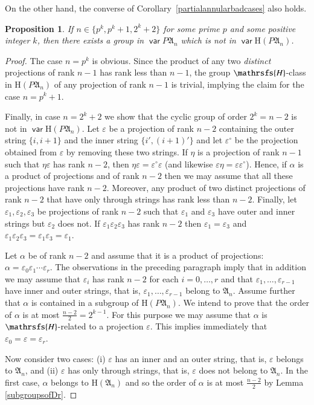 \documentclass[preprint,1p,times]{elsarticle}
\DeclareMathOperator{\var}{\mathsf{var}}
\numberwithin{equation}{section}
\newtheorem{Prop}[Thm]{Proposition}
\theoremstyle{remark}
\def\Hc{\mathrsfs{H}}
\def\al{\alpha}
\def\ep{\varepsilon}
\def\H{\mathrm H}
\def\A{\mathfrak{A}}
\begin{document}
On the other hand, the converse of Corollary~\ref{partialannularbadcases} also holds.

\begin{Prop}
\label{partialannulargoodcases} If $n\in\{p^k,p^k+1,2^k+2\}$ for some prime $p$ and some positive integer $k$, then
there exists a group in $\var P\A_n$ which is not in $\var\H(P\A_n)$.
\end{Prop}

\begin{proof} The case $n=p^k$ is obvious. Since the product of any two
\emph{distinct} projections of rank $n-1$ has rank less than $n-1$, the group $\Hc$-class in $\H(P\A_n)$ of any
projection of rank $n-1$ is trivial, implying the claim for the case $n=p^k+1$.

Finally, in case $n=2^k+2$ we show that the cyclic group of order $2^k=n-2$ is not in $\var\H(P\A_n)$. Let $\ep$ be a
projection of rank $n-2$ containing the outer string $\{i,i+1\}$ and the inner string $\{i',(i+1)'\}$ and let
$\ep^\circ$ be the projection obtained from $\ep$ by removing these two strings. If $\eta$ is a projection of rank
$n-1$ such that $\eta\ep$ has rank $n-2$, then $\eta\ep=\ep^\circ\ep$ (and likewise $\ep\eta=\ep\ep^\circ$). Hence, if
$\al$ is {a product of projections and of rank $n-2$} then we may assume that all these projections have rank  $n-2$.
Moreover, any product of two distinct projections of rank $n-2$ that have only through strings has rank less than
$n-2$. Finally, let $\ep_1, \ep_2, \ep_3$ be projections of rank $n-2$ such that $\ep_1$ and $\ep_3$ have outer and
inner strings but $\ep_2$ does not. If $\ep_1\ep_2\ep_3$ has rank $n-2$ then $\ep_1=\ep_3$ and
$\ep_1\ep_2\ep_3=\ep_1\ep_3=\ep_1$.

Let $\alpha$ be of rank $n-2$ and assume that it is a product of projections: $\alpha=\ep_0\ep_1\cdots \ep_r$. The
observations in the preceding paragraph imply that in addition we may assume that $\ep_i$ has rank $n-2$ for each
$i=0,\dots,r$ and that $\ep_1,\dots, \ep_{r-1}$ have inner and outer strings, that is, $\ep_1,\dots, \ep_{r-1}$ belong
to $\A_n$. Assume further that $\alpha$ is contained in a subgroup of $\H (P\A_n)$. We intend to prove that the order
of $\alpha$ is at most $\frac{n-2}2=2^{k-1}$. For this purpose we may assume that $\alpha$ is $\Hc$-related to a
projection $\ep$. This implies immediately that $\ep_0=\ep=\ep_r$.

Now consider two cases: (i) $\ep$ has an inner and an outer string, that is, $\ep$ belongs to $\A_n$, and (ii) $\ep$
has only through strings, that is, $\ep$ does not belong to $\A_n$. In the first case, $\alpha$ belongs to $\H(\A_n)$
and so the order of $\alpha$ is at most $\frac{n-2}2$ by Lemma \ref{subgroupsofDr}.


\end{proof}
\end{document}

